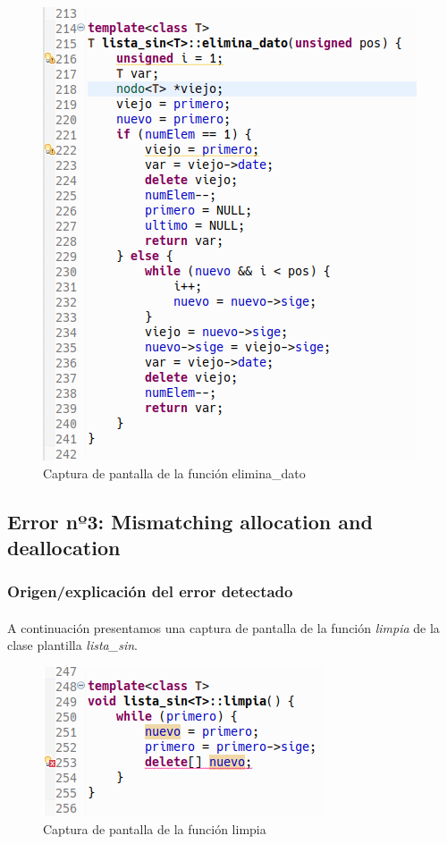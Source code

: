 			\begin{figure}[H]
				\centering
				\includegraphics[scale=0.7]{img/captura47.png}
				\caption{Captura de pantalla de la función elimina\_dato}
				\label{captura47}
			\end{figure}
		
	\subsection{Error nº3: Mismatching allocation and deallocation}

		\subsubsection{Origen/explicación del error detectado}
		
			\paragraph{}A continuación presentamos una captura de pantalla de la función \textit{limpia} de la clase plantilla \textit{lista\_sin}.
		
			\begin{figure}[H]
				\centering
				\includegraphics[scale=0.7]{img/captura48.png}
				\caption{Captura de pantalla de la función limpia}
				\label{captura48}
			\end{figure}
	
